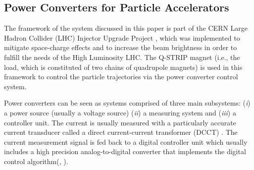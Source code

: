 \documentclass[journal]{IEEEtran}
\begin{document}


\subsection{Power Converters for Particle Accelerators}
The framework of the system discussed in this paper is part of the CERN Large Hadron Collider (LHC) Injector Upgrade Project \cite{BHAK14},  which was implemented to mitigate space-charge effects and to increase the beam brightness in order to fulfill the needs of the High Luminosity LHC. The Q-STRIP magnet (i.e., the load, which is constituted of two chains of quadrupole magnets) is used in this framework to control the particle trajectories via the power converter control system.

Power converters can be seen as systems comprised of three main subsystems: (\textit{i}) a power source (usually a voltage source) (\textit{ii}) a measuring system and (\textit{iii}) a controller unit. 
The current is usually measured with a particularly accurate current transducer called a direct current-current transformer (DCCT) \cite{Kin01}. The current measurement signal is fed back to a digital controller unit which usually includes a high precision analog-to-digital converter that implements the digital control algorithm(\cite{TPMK10}, \cite{BFC07}). 
\end{document}
